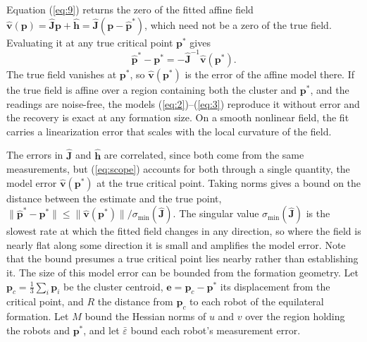 \documentclass[lettersize,journal]{IEEEtran}
\begin{document}
Equation (\ref{eq:9}) returns the zero of the fitted affine field $\hat{\mathbf{v}}(\mathbf{p}) = \hat{\mathbf{J}}\mathbf{p} + \hat{\mathbf{h}} = \hat{\mathbf{J}}(\mathbf{p} - \hat{\mathbf{p}}^*)$, which need not be a zero of the true field. Evaluating it at any true critical point $\mathbf{p}^*$ gives
\begin{equation}\label{eq:scope}
\hat{\mathbf{p}}^* - \mathbf{p}^* = -\hat{\mathbf{J}}^{-1}\hat{\mathbf{v}}(\mathbf{p}^*).
\end{equation}
The true field vanishes at $\mathbf{p}^*$, so $\hat{\mathbf{v}}(\mathbf{p}^*)$ is the error of the affine model there. If the true field is affine over a region containing both the cluster and $\mathbf{p}^*$, and the readings are noise-free, the models (\ref{eq:2})--(\ref{eq:3}) reproduce it without error and the recovery is exact at any formation size. On a smooth nonlinear field, the fit carries a linearization error that scales with the local curvature of the field.

The errors in $\hat{\mathbf{J}}$ and $\hat{\mathbf{h}}$ are correlated, since both come from the same measurements, but (\ref{eq:scope}) accounts for both through a single quantity, the model error $\hat{\mathbf{v}}(\mathbf{p}^*)$ at the true critical point. Taking norms gives a bound on the distance between the estimate and the true point, $\|\hat{\mathbf{p}}^* - \mathbf{p}^*\| \le \|\hat{\mathbf{v}}(\mathbf{p}^*)\|/\sigma_{\min}(\hat{\mathbf{J}})$. The singular value $\sigma_{\min}(\hat{\mathbf{J}})$ is the slowest rate at which the fitted field changes in any direction, so where the field is nearly flat along some direction it is small and amplifies the model error. Note that the bound presumes a true critical point lies nearby rather than establishing it.
The size of this model error can be bounded from the formation geometry. Let $\mathbf{p}_c = \frac{1}{3}\sum_i\mathbf{p}_i$ be the cluster centroid, $\mathbf{e} = \mathbf{p}_c - \mathbf{p}^*$ its displacement from the critical point, and $R$ the distance from $\mathbf{p}_c$ to each robot of the equilateral formation. Let $M$ bound the Hessian norms of $u$ and $v$ over the region holding the robots and $\mathbf{p}^*$, and let $\bar{\varepsilon}$ bound each robot's measurement error.
\end{document}
